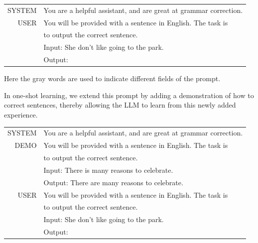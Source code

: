 \vspace{0.5em}
\begin{tcolorbox}

\begingroup
\renewcommand{\arraystretch}{1.0}
\setlength{\tabcolsep}{6pt}
\begin{tabular}{r l}
{\color{gray} \footnotesize{SYSTEM}} & You are a helpful assistant, and are great at grammar correction. \\ [0.2cm]
{\color{gray} \footnotesize{USER}}  & You will be provided with a sentence in English. The task is \\
 & to output the correct sentence. \\ [0.1cm]
 & Input: She don't like going to the park. \\
 & Output: \underline{\hspace{2em}}
\end{tabular}
\endgroup

\end{tcolorbox}
\vspace{0.5em}

\noindent Here the gray words are used to indicate different fields of the prompt.

In one-shot learning, we extend this prompt by adding a demonstration of how to correct sentences, thereby allowing the LLM to learn from this newly added experience.

\vspace{0.5em}
\begin{tcolorbox}

\begingroup
\renewcommand{\arraystretch}{1.0}
\setlength{\tabcolsep}{6pt}
\begin{tabular}{r l}
{\color{gray} \footnotesize{SYSTEM}} & You are a helpful assistant, and are great at grammar correction. \\ [0.2cm]
{\color{gray} \footnotesize{DEMO}}  & You will be provided with a sentence in English. The task is \\
 & to output the correct sentence. \\ [0.1cm]
 & Input: There is many reasons to celebrate. \\
 & Output: There are many reasons to celebrate. \\ [0.2cm]
{\color{gray} \footnotesize{USER}}  & You will be provided with a sentence in English. The task is \\
 & to output the correct sentence. \\ [0.1cm]
 & Input: She don't like going to the park. \\
 & Output: \underline{\hspace{2em}}
\end{tabular}
\endgroup

\end{tcolorbox}
\vspace{0.5em}

